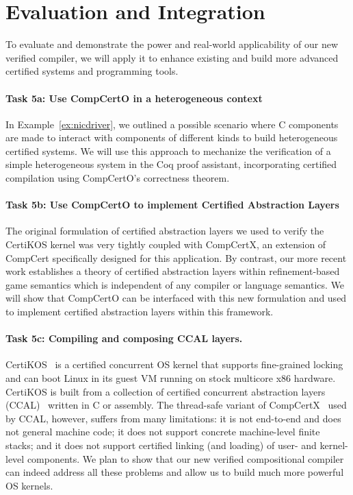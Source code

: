 \section{Evaluation and Integration}

To evaluate and demonstrate the power and real-world applicability of
our new verified compiler, we will apply it to enhance existing and
build more advanced certified systems and programming tools.

\vspace*{-2ex}
\paragraph*{Task 5a: Use CompCertO in a heterogeneous context}

In Example~\ref{ex:nicdriver},
we outlined a possible scenario where C components
are made to interact with components of different kinds
to build heterogeneous certified systems.
We will use this approach to
mechanize the verification of a simple heterogeneous system
in the Coq proof assistant,
incorporating certified compilation using CompCertO's correctness theorem.

\vspace*{-2ex}
\paragraph*{Task 5b: Use CompCertO to implement Certified Abstraction Layers}

The original formulation of certified abstraction layers
we used to verify the CertiKOS kernel \cite{popl15}
was very tightly coupled with CompCertX,
an extension of CompCert specifically designed for this application.
By contrast,
our more recent work establishes a theory of certified abstraction layers
within refinement-based game semantics
which is independent of any compiler
or language semantics.
We will show that CompCertO can be interfaced with this new formulation
and used to implement certified abstraction layers within this framework.

\vspace*{-2ex}
\paragraph*{Task 5c: Compiling and composing CCAL layers.}
CertiKOS~\cite{certikos-osdi16} is a certified concurrent OS kernel
that supports fine-grained locking and can boot Linux in its guest VM
running on stock multicore x86 hardware.  CertiKOS is built from a
collection of certified concurrent abstraction layers
(CCAL)~\cite{ccal18} written in C or assembly.  The thread-safe
variant of CompCertX~\cite{dscal15} used by CCAL, however, suffers
from many limitations: it is not end-to-end and does not general
machine code; it does not support concrete machine-level finite
stacks; and it does not support certified linking (and loading) of
user- and kernel-level components. We plan to show that our new
verified compositional compiler can indeed address all these problems
and allow us to build much more powerful OS kernels.

